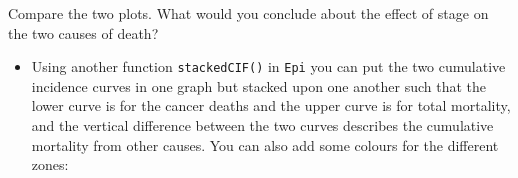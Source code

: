 \documentclass[
]{book}
\newenvironment{Shaded}{\begin{snugshade}}{\end{snugshade}}
\newcommand{\AttributeTok}[1]{\textcolor[rgb]{0.13,0.29,0.53}{#1}}
\newcommand{\DecValTok}[1]{\textcolor[rgb]{0.00,0.00,0.81}{#1}}
\newcommand{\FloatTok}[1]{\textcolor[rgb]{0.00,0.00,0.81}{#1}}
\newcommand{\FunctionTok}[1]{\textcolor[rgb]{0.13,0.29,0.53}{\textbf{#1}}}
\newcommand{\NormalTok}[1]{#1}
\newcommand{\SpecialCharTok}[1]{\textcolor[rgb]{0.81,0.36,0.00}{\textbf{#1}}}
\newcommand{\StringTok}[1]{\textcolor[rgb]{0.31,0.60,0.02}{#1}}
\providecommand{\tightlist}{%
  \setlength{\itemsep}{0pt}\setlength{\parskip}{0pt}}
\begin{document}
\begin{Shaded}
\end{Shaded}

Compare the two plots. What would you conclude about the
effect of stage on the two causes of death?

\begin{itemize}
\tightlist
\item
  Using another function \texttt{stackedCIF()} in \texttt{Epi} you can
  put the two cumulative incidence curves in one graph but stacked upon one another such that
  the lower curve is for the cancer deaths and the upper curve is for total mortality,
  and the vertical difference between the two curves describes the
  cumulative mortality from other causes. You can also add some colours for the different zones:
\end{itemize}
\end{document}
